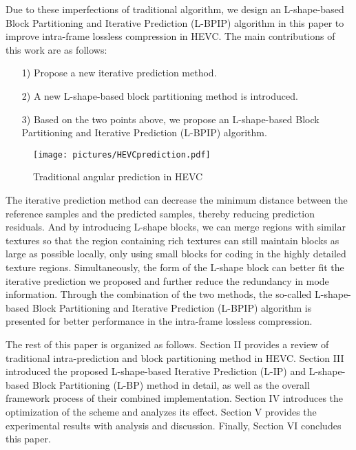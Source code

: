 \documentclass[journal]{IEEEtran}
\begin{document}
Due to these imperfections of traditional algorithm, we design an L-shape-based Block Partitioning and Iterative Prediction (L-BPIP) algorithm in this paper to improve intra-frame lossless compression in HEVC. The main contributions of this work are as follows:

\begin{itemize}
    \item [1)]
          Propose a new iterative prediction method.
    \item [2)]
          A new L-shape-based block partitioning method is introduced.
    \item [3)]
          Based on the two points above, we propose an L-shape-based Block Partitioning and Iterative Prediction (L-BPIP) algorithm.
\end{itemize}

\begin{figure*}[tp]
    \centering
    \texttt{[image: pictures/HEVCprediction.pdf]}
    \caption{Traditional angular prediction in HEVC}
    \label{fig:HEVCprediction}
\end{figure*}

The iterative prediction method can decrease the minimum distance between the reference samples and the predicted samples, thereby reducing prediction residuals. And by introducing L-shape blocks, we can merge regions with similar textures so that the region containing rich textures can still maintain blocks as large as possible locally, only using small blocks for coding in the highly detailed texture regions. Simultaneously, the form of the L-shape block can better fit the iterative prediction we proposed and further reduce the redundancy in mode information. Through the combination of the two methods, the so-called L-shape-based Block Partitioning and Iterative Prediction (L-BPIP) algorithm is presented for better performance in the intra-frame lossless compression.

The rest of this paper is organized as follows. Section II provides a review of traditional intra-prediction and block partitioning method in HEVC. Section III introduced the proposed L-shape-based Iterative Prediction (L-IP) and L-shape-based Block Partitioning (L-BP) method in detail, as well as the overall framework process of their combined implementation. Section IV introduces the optimization of the scheme and analyzes its effect. Section V provides the experimental results with analysis and discussion. Finally, Section VI concludes this paper.
\end{document}
